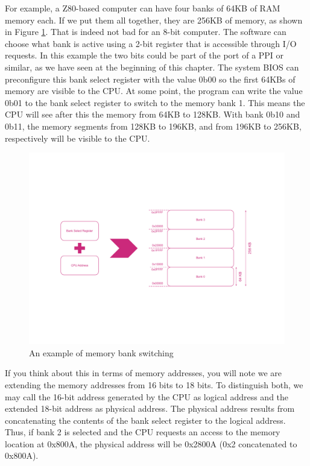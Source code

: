 For example, a Z80-based computer can have four banks of 64KB of RAM memory each. If we put them all together, they are 256KB of memory, as shown in Figure \ref{fig:msx-mem-banks}. That is indeed not bad for an 8-bit computer. The software can choose what bank is active using a 2-bit register that is accessible through I/O requests. In this example the two bits could be part of the port of a PPI or similar, as we have seen at the beginning of this chapter. The system BIOS can preconfigure this bank select register with the value 0b00 so the first 64KBs of memory are visible to the CPU. At some point, the program can write the value 0b01 to the bank select register to switch to the memory bank 1. This means the CPU will see after this the memory from 64KB to 128KB. With bank 0b10 and 0b11, the memory segments from 128KB to 196KB, and from 196KB to 256KB, respectively will be visible to the CPU. 

\begin{figure}
	\centering
	\includegraphics[width=1\linewidth,trim={0cm 150 0 100}]{images/figures/msx-mem-banks}
	\caption{An example of memory bank switching}
	\label{fig:msx-mem-banks}
\end{figure}

If you think about this in terms of memory addresses, you will note we are extending the memory addresses from 16 bits to 18 bits. To distinguish both, we may call the 16-bit address generated by the CPU as logical address and the extended 18-bit address as physical address. The physical address results from concatenating the contents of the bank select register to the logical address. Thus, if bank 2 is selected and the CPU requests an access to the memory location at 0x800A, the physical address will be 0x2800A (0x2 concatenated to 0x800A). 

